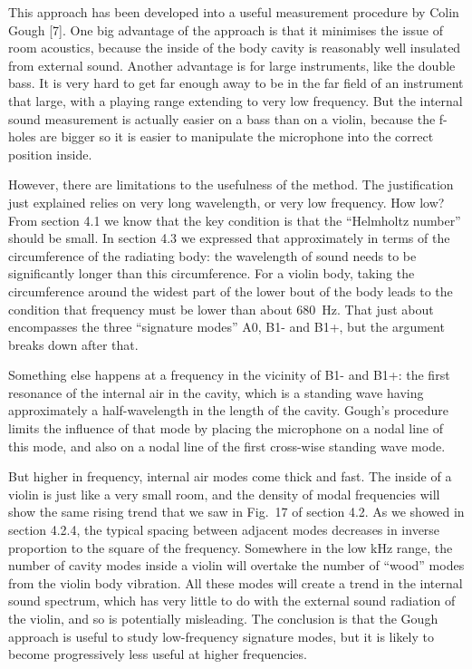   This approach has been developed into a useful measurement procedure by Colin 
  Gough [7]. One big advantage of the approach is that it minimises the issue 
  of room acoustics, because the inside of the body cavity is reasonably well 
  insulated from external sound. Another advantage is for large instruments, 
  like the double bass. It is very hard to get far enough away to be in the far 
  field of an instrument that large, with a playing range extending to very low 
  frequency. But the internal sound measurement is actually easier on a bass 
  than on a violin, because the f-holes are bigger so it is easier to 
  manipulate the microphone into the correct position inside. 

  However, there are limitations to the usefulness of the method. The 
  justification just explained relies on very long wavelength, or very low 
  frequency. How low? From section 4.1 we know that the key condition is that 
  the “Helmholtz number” should be small. In section 4.3 we expressed that 
  approximately in terms of the circumference of the radiating body: the 
  wavelength of sound needs to be significantly longer than this circumference. 
  For a violin body, taking the circumference around the widest part of the 
  lower bout of the body leads to the condition that frequency must be lower 
  than about 680~Hz. That just about encompasses the three “signature modes” 
  A0, B1- and B1+, but the argument breaks down after that. 

  Something else happens at a frequency in the vicinity of B1- and B1+: the 
  first resonance of the internal air in the cavity, which is a standing wave 
  having approximately a half-wavelength in the length of the cavity. Gough’s 
  procedure limits the influence of that mode by placing the microphone on a 
  nodal line of this mode, and also on a nodal line of the first cross-wise 
  standing wave mode. 

  But higher in frequency, internal air modes come thick and fast. The inside 
  of a violin is just like a very small room, and the density of modal 
  frequencies will show the same rising trend that we saw in Fig.\ 17 of 
  section 4.2. As we showed in section 4.2.4, the typical spacing between 
  adjacent modes decreases in inverse proportion to the square of the 
  frequency. Somewhere in the low kHz range, the number of cavity modes inside 
  a violin will overtake the number of “wood” modes from the violin body 
  vibration. All these modes will create a trend in the internal sound 
  spectrum, which has very little to do with the external sound radiation of 
  the violin, and so is potentially misleading. The conclusion is that the 
  Gough approach is useful to study low-frequency signature modes, but it is 
  likely to become progressively less useful at higher frequencies. 

